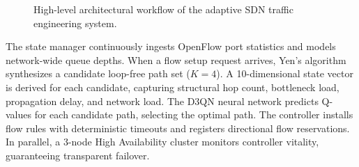 \documentclass[12pt,a4paper,oneside]{report}
\begin{document}
\begin{figure}[htbp]
\centering
{}
\caption{High-level architectural workflow of the adaptive SDN traffic engineering system.}
\label{fig:project_workflow}
\end{figure}

The state manager continuously ingests OpenFlow port statistics and models network-wide queue depths. When a flow setup request arrives, Yen's algorithm synthesizes a candidate loop-free path set ($K=4$). A 10-dimensional state vector is derived for each candidate, capturing structural hop count, bottleneck load, propagation delay, and network load. The D3QN neural network predicts Q-values for each candidate path, selecting the optimal path. The controller installs flow rules with deterministic timeouts and registers directional flow reservations. In parallel, a 3-node High Availability cluster monitors controller vitality, guaranteeing transparent failover.
\end{document}
